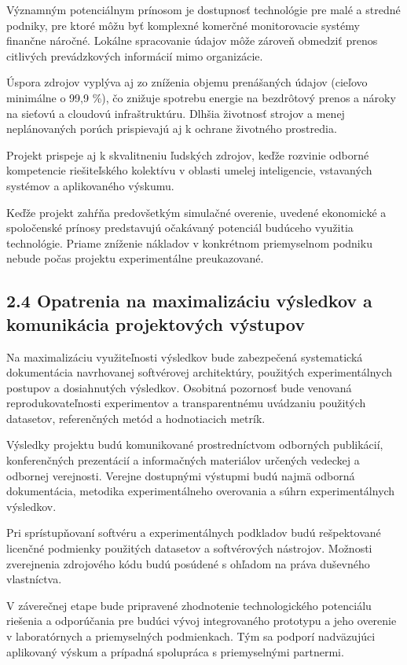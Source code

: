 \documentclass[10pt,a4paper]{article}
\begin{document}
Významným potenciálnym prínosom je dostupnosť technológie pre malé a stredné podniky, pre ktoré môžu byť komplexné komerčné monitorovacie systémy finančne náročné. Lokálne spracovanie údajov môže zároveň obmedziť prenos citlivých prevádzkových informácií mimo organizácie.

Úspora zdrojov vyplýva aj zo zníženia objemu prenášaných údajov (cieľovo minimálne o 99,9 \%), čo znižuje spotrebu energie na bezdrôtový prenos a nároky na sieťovú a cloudovú infraštruktúru. Dlhšia životnosť strojov a menej neplánovaných porúch prispievajú aj k ochrane životného prostredia.

Projekt prispeje aj k skvalitneniu ľudských zdrojov, keďže rozvinie odborné kompetencie riešiteľského kolektívu v oblasti umelej inteligencie, vstavaných systémov a aplikovaného výskumu.

Keďže projekt zahŕňa predovšetkým simulačné overenie, uvedené ekonomické a spoločenské prínosy predstavujú očakávaný potenciál budúceho využitia technológie. Priame zníženie nákladov v konkrétnom priemyselnom podniku nebude počas projektu experimentálne preukazované.

\subsection*{2.4 Opatrenia na maximalizáciu
výsledkov a komunikácia projektových výstupov}

Na maximalizáciu využiteľnosti výsledkov bude zabezpečená systematická dokumentácia navrhovanej softvérovej architektúry, použitých experimentálnych postupov a dosiahnutých výsledkov. Osobitná pozornosť bude venovaná reprodukovateľnosti experimentov a transparentnému uvádzaniu použitých datasetov, referenčných metód a hodnotiacich metrík.

Výsledky projektu budú komunikované prostredníctvom odborných publikácií, konferenčných prezentácií a informačných materiálov určených vedeckej a odbornej verejnosti. Verejne dostupnými výstupmi budú najmä odborná dokumentácia, metodika experimentálneho overovania a súhrn experimentálnych výsledkov.

Pri sprístupňovaní softvéru a experimentálnych podkladov budú rešpektované licenčné podmienky použitých datasetov a softvérových nástrojov. Možnosti zverejnenia zdrojového kódu budú posúdené s ohľadom na práva duševného vlastníctva.

V záverečnej etape bude pripravené zhodnotenie technologického potenciálu riešenia a odporúčania pre budúci vývoj integrovaného prototypu a jeho overenie v laboratórnych a priemyselných podmienkach. Tým sa podporí nadväzujúci aplikovaný výskum a prípadná spolupráca s priemyselnými partnermi.
\end{document}
